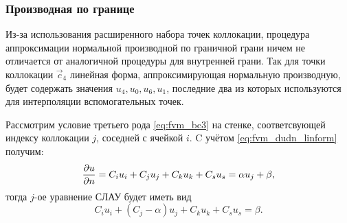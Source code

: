 \subsubsection{Производная по границе}
Из-за использования расширенного набора точек коллокации, 
процедура аппроксимации нормальной производной по граничной грани
ничем не отличается от аналогичной процедуры
для внутренней грани.
Так для точки коллокации $\vec c_4$
линейная форма, аппроксимирующая нормальную производную,
будет содержать значения $u_4, u_0, u_6, u_1$,
последние два из которых используются для интерполяции
вспомогательных точек.

Рассмотрим условие третьего рода \cref{eq:fvm_bc3} на стенке, соответсвующей
индексу коллокации $j$, соседней с ячейкой $i$.
C учётом \cref{eq:fvm_dudn_linform} получим:
\begin{equation*}
\frac{\partial u}{\partial n} = C_i u_i + C_j u_j + C_k u_k + C_s u_s = \alpha u_j + \beta,
\end{equation*}
тогда $j$-ое уравнение СЛАУ будет иметь вид
\begin{equation}
\label{eq:fvm_bc3_skew_slae}
C_i u_i + (C_j - \alpha) u_j + C_k u_k + C_s u_s = \beta.
\end{equation}

